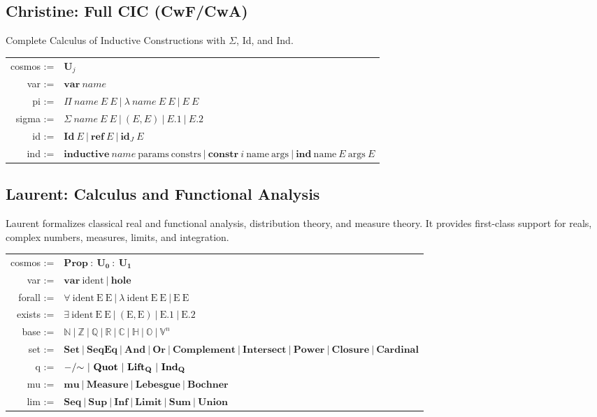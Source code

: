 \documentclass{article}
\theoremstyle{definition}
\theoremstyle{plain}
\begin{document}
\subsection{Christine: Full CIC (CwF/CwA)}
Complete Calculus of Inductive Constructions with $\Sigma$, Id, and Ind.
\begin{table}[ht!]
\centering
\begin{tabular}{rl}
 cosmos :=&$\textbf{U}_j$ \\
    var :=&$\textbf{var}\ name$ \\
     pi :=&$\Pi\ name\ E\ E\ |\ \lambda\ name\ E\ E\ |\ E\ E$ \\
  sigma :=&$\Sigma\ name\ E\ E\ |\ (E,E)\ |\ E.1\ |\ E.2$ \\
     id :=&$\textbf{Id}\ E\ |\ \textbf{ref}\ E\ |\ \textbf{id$_J$}\ E$ \\
    ind :=&$\textbf{inductive}\ name\ \textrm{params}\ \textrm{constrs}\ |\ \textbf{constr}\ i\ \textrm{name}\ \textrm{args}\ |\ \textbf{ind}\ \textrm{name}\ E\ \textrm{args}\ E$ \\
\end{tabular}
\end{table}

\subsection{Laurent: Calculus and Functional Analysis}
Laurent formalizes classical real and functional analysis, distribution theory, and measure theory. It provides first-class support for reals, complex numbers, measures, limits, and integration.
\begin{table}[ht!]
\centering
\begin{tabular}{rl}
   cosmos :=&$\mathbf{Prop}\ :\ \mathbf{U_0}\ :\ \mathbf{U_1}$ \\
      var :=&$\mathbf{var}\ \mathrm{ident}\ |\ \mathbf{hole}$ \\
   forall :=&$\forall\ \mathrm{ident}\ \mathrm{E}\ \mathrm{E}\ |\ \lambda\ \mathrm{ident}\ \mathrm{E}\ \mathrm{E}\ |\ \mathrm{E}\ \mathrm{E}$ \\
   exists :=&$\exists\ \mathrm{ident}\ \mathrm{E}\ \mathrm{E}\ |\ (\mathrm{E}, \mathrm{E})\ |\ \mathrm{E}\mathbf{.1}\ |\ \mathrm{E}\mathbf{.2}$ \\
     base :=&$\mathbb{N}\ |\ \mathbb{Z}\ |\ \mathbb{Q}\ |\ \mathbb{R}\ |\ \mathbb{C}\ |\ \mathbb{H}\ |\ \mathbb{O}\ |\ \mathbb{V}^n$ \\
      set :=&$\mathbf{Set}\ |\ \mathbf{SeqEq}\ |\ \mathbf{And}\ |\ \mathbf{Or}\ |\ \mathbf{Complement}\ |\ \mathbf{Intersect}\ |\ \mathbf{Power}\ |\ \mathbf{Closure}\ |\ \mathbf{Cardinal}$ \\
        q :=&$\mathbf{-/\hspace{-1mm}\sim}\ |\ \mathbf{Quot}\ |\ \mathbf{Lift_Q}\ |\ \mathbf{Ind_Q}$ \\
       mu :=&$\mathbf{mu}\ |\ \mathbf{Measure}\ |\ \mathbf{Lebesgue}\ |\ \mathbf{Bochner}$ \\
      lim :=&$\mathbf{Seq}\ |\ \mathbf{Sup}\ |\ \mathbf{Inf}\ |\ \mathbf{Limit}\ |\ \mathbf{Sum}\ |\ \mathbf{Union}$ \\
\end{tabular}
\end{table}
\end{document}
